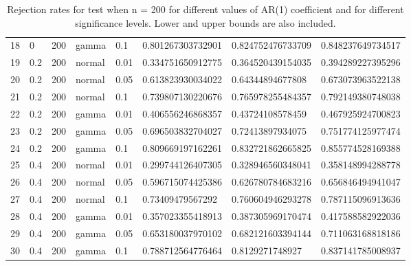 \begin{table}[ht]
\begin{tabular}{rlllllll}
  18 & 0 & 200 & gamma & 0.1 & 0.801267303732901 & 0.824752476733709 & 0.848237649734517 \\ 
  19 & 0.2 & 200 & normal & 0.01 & 0.334751650912775 & 0.364520439154035 & 0.394289227395296 \\ 
  20 & 0.2 & 200 & normal & 0.05 & 0.613823930034022 & 0.64344894677808 & 0.673073963522138 \\ 
  21 & 0.2 & 200 & normal & 0.1 & 0.739807130220676 & 0.765978255484357 & 0.792149380748038 \\ 
  22 & 0.2 & 200 & gamma & 0.01 & 0.406556246868357 & 0.43724108578459 & 0.467925924700823 \\ 
  23 & 0.2 & 200 & gamma & 0.05 & 0.696503832704027 & 0.72413897934075 & 0.751774125977474 \\ 
  24 & 0.2 & 200 & gamma & 0.1 & 0.809669197162261 & 0.832721862665825 & 0.855774528169388 \\ 
  25 & 0.4 & 200 & normal & 0.01 & 0.299744126407305 & 0.328946560348041 & 0.358148994288778 \\ 
  26 & 0.4 & 200 & normal & 0.05 & 0.596715074425386 & 0.626780784683216 & 0.656846494941047 \\ 
  27 & 0.4 & 200 & normal & 0.1 & 0.73409479567292 & 0.760604946293278 & 0.787115096913636 \\ 
  28 & 0.4 & 200 & gamma & 0.01 & 0.357023355418913 & 0.387305969170474 & 0.417588582922036 \\ 
  29 & 0.4 & 200 & gamma & 0.05 & 0.653180037970102 & 0.682121603394144 & 0.711063168818186 \\ 
  30 & 0.4 & 200 & gamma & 0.1 & 0.788712564776464 & 0.8129271748927 & 0.837141785008937 \\ 
   \hline
\end{tabular}
\caption{Rejection rates for test when n = 200 for 
                   different values of AR(1) coefficient and for different 
                   significance levels. Lower and upper bounds are also 
                   included.} 
\label{table:rr_200}
\end{table}

